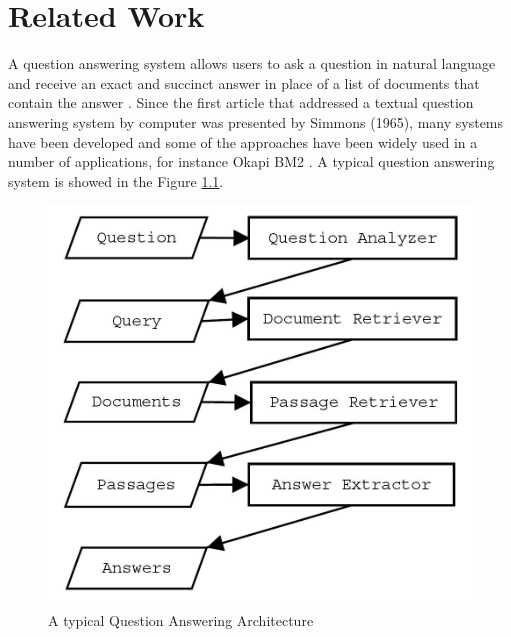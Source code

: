 \chapter{Related Work}


A question answering system allows users to ask a question in natural language and receive an exact and succinct answer in place of a list of documents that contain the answer \cite{kato2004hia, hirschman2002nlq}. Since the first article that addressed a textual question answering system by computer was presented by Simmons (1965)\cite{simmons1965aeq}, many systems have been developed and some of the approaches have been widely used in a number of applications, for instance Okapi BM2 \cite{robertson1996ot}. A typical question answering system is showed in the Figure \ref{fig: Question Answering Architecture}.

\begin{figure}[htbp]
\centering
\includegraphics[scale = 0.5]{QASystem.jpg}
\caption{A typical Question Answering Architecture}
\label{fig: Question Answering Architecture}
\end{figure}

